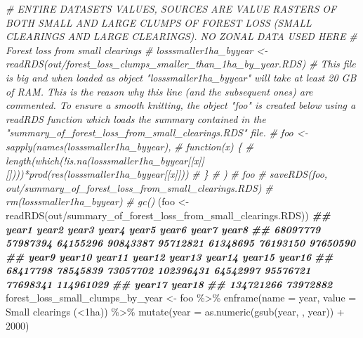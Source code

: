 \documentclass[10pt,landscape,a3paper]{article}
\newenvironment{Shaded}{\begin{snugshade}}{\end{snugshade}}
\newcommand{\AttributeTok}[1]{\textcolor[rgb]{0.77,0.63,0.00}{#1}}
\newcommand{\CommentTok}[1]{\textcolor[rgb]{0.56,0.35,0.01}{\textit{#1}}}
\newcommand{\DecValTok}[1]{\textcolor[rgb]{0.00,0.00,0.81}{#1}}
\newcommand{\DocumentationTok}[1]{\textcolor[rgb]{0.56,0.35,0.01}{\textbf{\textit{#1}}}}
\newcommand{\FunctionTok}[1]{\textcolor[rgb]{0.00,0.00,0.00}{#1}}
\newcommand{\NormalTok}[1]{#1}
\newcommand{\OtherTok}[1]{\textcolor[rgb]{0.56,0.35,0.01}{#1}}
\newcommand{\SpecialCharTok}[1]{\textcolor[rgb]{0.00,0.00,0.00}{#1}}
\newcommand{\StringTok}[1]{\textcolor[rgb]{0.31,0.60,0.02}{#1}}
\begin{document}
\begin{Shaded}
\begin{Highlighting}[]
\CommentTok{\# ENTIRE DATASETS VALUES, SOURCES ARE VALUE RASTERS OF BOTH SMALL AND LARGE CLUMPS OF FOREST LOSS (SMALL CLEARINGS AND LARGE CLEARINGS). NO ZONAL DATA USED HERE}
\CommentTok{\# Forest loss from small clearings}
\CommentTok{\# losssmaller1ha\_byyear \textless{}{-} readRDS(\textquotesingle{}out/forest\_loss\_clumps\_smaller\_than\_1ha\_by\_year.RDS\textquotesingle{}) \# This file is big and when loaded as object "losssmaller1ha\_byyear" will take at least 20 GB of RAM. This is the reason why this line (and the subsequent ones) are commented. To ensure a smooth knitting, the object "foo" is created below using a readRDS function which loads the summary contained in the "summary\_of\_forest\_loss\_from\_small\_clearings.RDS" file.}
\CommentTok{\# foo \textless{}{-} sapply(names(losssmaller1ha\_byyear),}
\CommentTok{\#        function(x) \{}
\CommentTok{\#          length(which(!is.na(losssmaller1ha\_byyear[[x]][])))*prod(res(losssmaller1ha\_byyear[[x]]))}
\CommentTok{\#        \}}
\CommentTok{\# )}
\CommentTok{\# foo}
\CommentTok{\# saveRDS(foo, \textquotesingle{}out/summary\_of\_forest\_loss\_from\_small\_clearings.RDS\textquotesingle{})}
\CommentTok{\# rm(losssmaller1ha\_byyear)}
\CommentTok{\# gc()}
\NormalTok{(foo }\OtherTok{\textless{}{-}} \FunctionTok{readRDS}\NormalTok{(}\StringTok{\textquotesingle{}out/summary\_of\_forest\_loss\_from\_small\_clearings.RDS\textquotesingle{}}\NormalTok{))}
\DocumentationTok{\#\#     year1     year2     year3     year4     year5     year6     year7     year8 }
\DocumentationTok{\#\#  68097779  57987394  64155296  90843387  95712821  61348695  76193150  97650590 }
\DocumentationTok{\#\#     year9    year10    year11    year12    year13    year14    year15    year16 }
\DocumentationTok{\#\#  68417798  78545839  73057702 102396431  64542997  95576721  77698341 114961029 }
\DocumentationTok{\#\#    year17    year18 }
\DocumentationTok{\#\# 134721266  73972882}
\NormalTok{forest\_loss\_small\_clumps\_by\_year }\OtherTok{\textless{}{-}}\NormalTok{ foo }\SpecialCharTok{\%\textgreater{}\%} 
  \FunctionTok{enframe}\NormalTok{(}\AttributeTok{name =} \StringTok{\textquotesingle{}year\textquotesingle{}}\NormalTok{, }\AttributeTok{value =} \StringTok{\textquotesingle{}Small clearings (\textless{}1ha)\textquotesingle{}}\NormalTok{) }\SpecialCharTok{\%\textgreater{}\%} 
  \FunctionTok{mutate}\NormalTok{(}\AttributeTok{year =} \FunctionTok{as.numeric}\NormalTok{(}\FunctionTok{gsub}\NormalTok{(}\StringTok{\textquotesingle{}year\textquotesingle{}}\NormalTok{, }\StringTok{\textquotesingle{}\textquotesingle{}}\NormalTok{, year)) }\SpecialCharTok{+} \DecValTok{2000}\NormalTok{)}


\end{Highlighting}
\end{Shaded}
\end{document}
